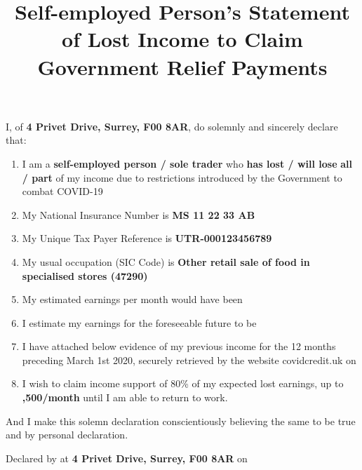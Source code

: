 \documentclass[12pt]{article}
\title{Self-employed Person's Statement of Lost Income to Claim Government Relief Payments}
\begin{document}
\selectfont
{}

\author{\href{\VAR{link_self}}{}}
\date{}
\maketitle

I, \textbf{} of \textbf{4 Privet Drive, Surrey, F00 8AR}, do solemnly and sincerely declare that: 

\vspace{12pt}

\begin{enumerate}
  \item I am a \textbf{self-employed person / sole trader} who \textbf{has lost / will lose} \textbf{all / part} of my income due to restrictions introduced by the Government to combat COVID-19
  \item My National Insurance Number is \textbf{MS 11 22 33 AB}
  \item My Unique Tax Payer Reference is \textbf{UTR-000123456789}
  \item My usual occupation (SIC Code) is \textbf{Other retail sale of food in specialised stores (47290)}
  \item My estimated earnings per month would have been \textbf{\textsterling {}}
  \item I estimate my earnings for the foreseeable future to be \textbf{}
  \item I have attached below evidence of my previous income for the 12 months preceding March 1st 2020, securely retrieved by the website covidcredit.uk on \textbf{}
  \item I wish to claim income support of 80\% of my expected lost earnings, up to \textbf{,500/month} until I am able to return to work.
\end{enumerate}

\vspace{12pt}

And I make this solemn declaration conscientiously believing the same to be true and by personal declaration.

\vspace{36pt}

Declared by \textbf{} at \textbf{4 Privet Drive, Surrey, F00 8AR} on \textbf{}

\vspace{18pt}
\end{document}
